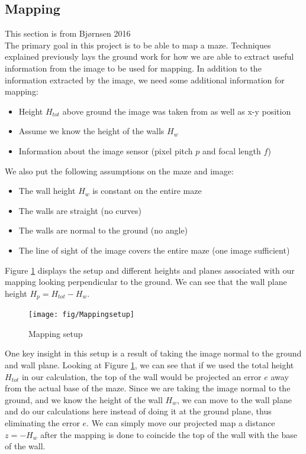 \subsection{Mapping}
This section is from Bjørnsen 2016\cite{kris}\\

\label{ch:mapping}
The primary goal in this project is to be able to map a maze. Techniques explained previously lays the ground work for how we are able to extract useful information from the image to be used for mapping. In addition to the information extracted by the image, we need some additional information for mapping:
\begin{itemize}
\item Height $H_{tot}$ above ground the image was taken from as well as x-y position
\item Assume we know the height of the walls $H_w$
\item Information about the image sensor (pixel pitch $p$ and focal length $f$)
\end{itemize}
We also put the following assumptions on the maze and image:
\begin{itemize}
\item The wall height $H_w$ is constant on the entire maze
\item The walls are straight (no curves)
\item The walls are normal to the ground (no angle)
\item The line of sight of the image covers the entire maze (one image sufficient)
\end{itemize}
Figure \ref{fig:mapping} displays the setup and different heights and planes associated with our mapping looking perpendicular to the ground. We can see that the wall plane height $H_p = H_{tot} - H_w$. 
\begin{figure}[H]
\centering
\texttt{[image: fig/Mappingsetup]}
  \caption{Mapping setup}
  \label{fig:mapping}
\end{figure}
One key insight in this setup is a result of taking the image normal to the ground and wall plane. Looking at Figure \ref{fig:mapping}, we can see that if we used the total height $H_{tot}$ in our calculation, the top of the wall would be projected an error $e$ away from the actual base of the maze. Since we are taking the image normal to the ground, and we know the height of the wall $H_w$, we can move to the wall plane and do our calculations here instead of doing it at the ground plane, thus eliminating the error $e$. We can simply move our projected map a distance $z = -H_w$ after the mapping is done to coincide the top of the wall with the base of the wall.

